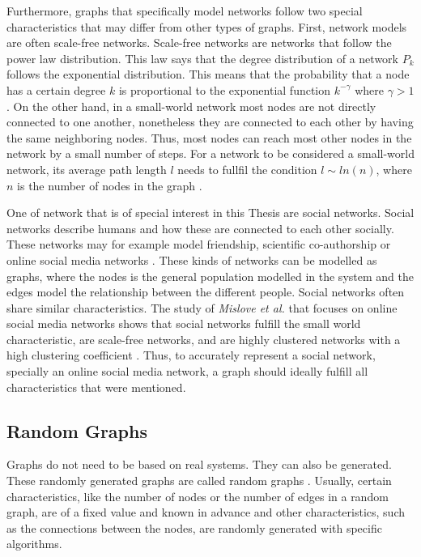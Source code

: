 Furthermore, graphs that specifically model networks follow two special 
characteristics that may differ from other types of graphs.
First, network models are often scale-free networks.
Scale-free networks are networks that follow the power law distribution.
This law says that the degree distribution of a network
$P_k$ follows the exponential distribution.
This means that the probability that a node has a certain degree $k$ 
is proportional to the exponential function $k^{-\gamma}$ where
$\gamma>1$.
On the other hand, in a small-world network most nodes are not directly
connected to one another, nonetheless they are connected to each other by
having the same neighboring nodes. Thus, most nodes can reach most other
nodes in the network by a small number of steps. For a network
to be considered a small-world network, its average path length $l$ 
needs to fullfil the condition $l\sim ln(n)$, where $n$ is the number
of nodes in the graph \cite{wattsmodel}.

One of network that is of special interest in this Thesis are social networks.
Social networks describe humans and 
how these are connected to each other socially. These networks
may for example model friendship, scientific co-authorship or online 
social media networks \cite{basicnetwork}. 
These kinds of networks can be modelled as graphs, where the nodes 
is the general population modelled in the system
and the edges model the relationship between the 
different people.
Social networks often share similar characteristics. The study of 
\textit{Mislove et al.} that focuses on online social media networks
shows that social networks fulfill the small world characteristic,
are scale-free networks, and
are highly clustered networks with a high clustering coefficient
\cite{mislovesocialnetworkcharacteristics}. Thus, to accurately represent 
a social network, specially an  online social media network, 
a graph should ideally fulfill all characteristics that were mentioned.

\subsection{Random Graphs}
\label{randomgraphssection}
Graphs do not need to be based on real systems. They can also be generated. 
These randomly generated graphs are called random graphs \cite{randomgraphs}.
Usually, certain characteristics, like the number of nodes or the number 
of edges in a random graph, are of a fixed value
and known in advance and other characteristics, such as the connections between 
the nodes, are randomly generated with specific algorithms.

